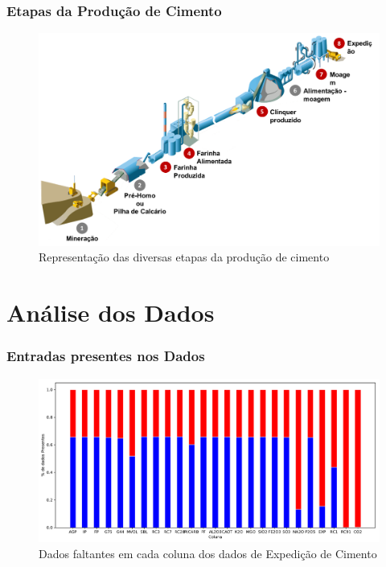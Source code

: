 \documentclass{beamer}
\begin{document}
\begin{frame}
\frametitle{Etapas da Produção de Cimento}
\begin{figure}[H]
\centering
\includegraphics[scale=0.5]{cimento.png}
\caption{Representação das diversas etapas da produção de cimento}
\end{figure}
\end{frame}

\section{Análise dos Dados}

\begin{frame}
  \frametitle{Entradas presentes nos Dados}
\begin{figure}[H]
\centering
\includegraphics[scale=0.3]{slides_dados_pct}
\caption{Dados faltantes em cada coluna dos dados de Expedição de Cimento}
\end{figure}

\end{frame}
\end{document}
